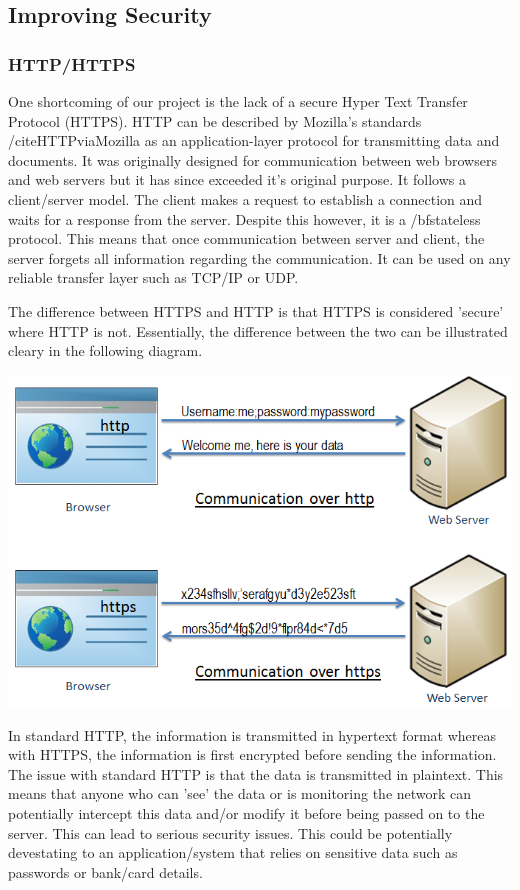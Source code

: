     \subsection{Improving Security}
    \subsubsection{HTTP/HTTPS}
    One shortcoming of our project is the lack of a secure Hyper Text Transfer Protocol (HTTPS). HTTP can be described by Mozilla's standards /cite{HTTPviaMozilla} as an application-layer protocol 
    for transmitting data and documents. It was originally designed for communication between web browsers and web servers but it has since exceeded it's original purpose. It follows a client/server model. The client makes a 
    request to establish a connection and waits for a response from the server. Despite this however, it is a /bf{stateless} protocol. This means that once communication between server and client, the server forgets all information regarding
    the communication. It can be used on any reliable transfer layer such as TCP/IP or UDP.

    The difference between HTTPS and HTTP is that HTTPS is considered 'secure' where HTTP is not. Essentially, the difference between the two can be illustrated cleary in the following diagram.

    \begin{center}    
      \includegraphics{img/HTTPS.png}
    \end{center}

    In standard HTTP, the information is transmitted in hypertext format whereas with HTTPS, the information is first encrypted before sending the information.
    The issue with standard HTTP is that the data is transmitted in plaintext. This means that anyone who can 'see' the data or is monitoring the network can potentially intercept this data and/or modify it before being passed on to the server. This can 
    lead to serious security issues. This could be potentially devestating to an application/system that relies on sensitive data such as passwords or bank/card details.

